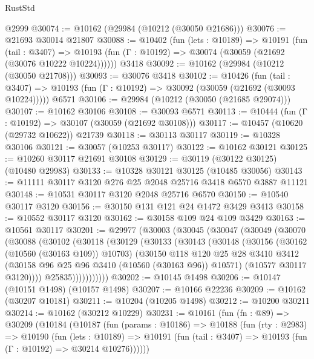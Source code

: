 \begin{lexlean}{RustStd}
\begin{coremodule}
    @2999
@30074 := @10162 (@29984 (@10212 (@30050 @21686)))
@30076 := @21693 @30014 @21807
@30088 := @10402
    (fun (lets : @10189) =>
    @10191
      (fun (tail : @3407) =>
      @10193 (fun (Γ : @10192) => @30074 (@30059 (@21692 (@30076 @10222 @10224))))))
    @3418
@30092 := @10162 (@29984 (@10212 (@30050 @21708)))
@30093 := @30076 @3418
@30102 := @10426
    (fun (tail : @3407) => @10193 (fun (Γ : @10192) => @30092 (@30059 (@21692 (@30093 @10224)))))
    @6571
@30106 := @29984 (@10212 (@30050 (@21685 @29074)))
@30107 := @10162 @30106
@30108 := @30093 @6571
@30113 := @10444 (fun (Γ : @10192) => @30107 (@30059 (@21692 @30108)))
@30117 := @10457 (@10620 (@29732 @10622)) @21739
@30118 := @30113 @30117
@30119 := @10328 @30106
@30121 := @30057 (@10253 @30117)
@30122 := @10162 @30121
@30125 := @10260 @30117 @21691 @30108
@30129 := @30119 (@30122 @30125) (@10480 @29983)
@30133 := @10328 @30121 @30125 (@10485 @30056)
@30143 := @11111 @30117 @3120 @276 @25 @2048 @25716 @3418 @6570 @3887 @11121
@30148 := @10531 @30117 @3120 @2048 @25716 @6570
@30150 := @10540 @30117 @3120
@30156 := @30150 @131 @121 @24 @1472 @3429 @3413
@30158 := @10552 @30117 @3120
@30162 := @30158 @109 @24 @109 @3429
@30163 := @10561 @30117
@30201 := @29977
    (@30003
      (@30045
        (@30047
          (@30049
            (@30070
              (@30088
                (@30102
                  (@30118
                    (@30129
                      (@30133
                        (@30143
                          (@30148
                            (@30156
                              (@30162 (@10560 (@30163 @109)) @10703)
                              (@30150
                                @118
                                @120
                                @25
                                @28
                                @3410
                                @3412
                                (@30158 @96 @25 @96 @3410 (@10560 (@30163 @96)) @10571)
                                (@10577 @30117 @3120))))
                          @25835)))))))))))
@30202 := @10145 @1498
@30206 := @10147 (@10151 @1498) (@10157 @1498)
@30207 := @10166 @22236
@30209 := @10162 (@30207 @10181)
@30211 := @10204 (@10205 @1498)
@30212 := @10200 @30211
@30214 := @10162 (@30212 @10229)
@30231 := @10161
    (fun (fn : @89) =>
    @30209
      (@10184
        (@10187
          (fun (params : @10186) =>
          @10188
            (fun (rty : @2983) =>
            @10190
              (fun (lets : @10189) =>
              @10191 (fun (tail : @3407) => @10193 (fun (Γ : @10192) => @30214 @10276))))))

\end{coremodule}
\end{lexlean}
